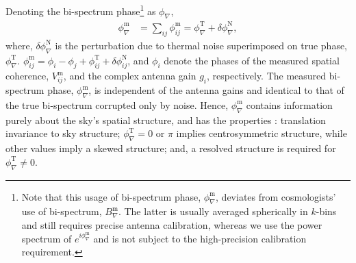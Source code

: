 \documentclass[
reprint,
superscriptaddress,
amsmath,
amssymb,
aps,
prd
]{revtex4-1}
\begin{document}

Denoting the bi-spectrum phase\footnote{Note that this usage of bi-spectrum phase, $\phi_\nabla^\textrm{m}$, deviates from cosmologists' use of bi-spectrum, $B_\nabla^\textrm{m}$. The latter is usually averaged spherically in $k$-bins and still requires precise antenna calibration, whereas we use the power spectrum of $e^{i\phi_\nabla^\textrm{m}}$ and is not subject to the high-precision calibration requirement.} as $\phi_\nabla$, 
\begin{align}
  \phi_\nabla^\textrm{m} &= \sum_{ij}\phi_{ij}^\textrm{m} = \phi_\nabla^\textrm{T} + \delta\phi_\nabla^\textrm{N} \label{eqn:cpphase-sum},
\end{align}
where, $\delta\phi_\nabla^\textrm{N}$ is the perturbation due to thermal noise superimposed on true phase, $\phi_\nabla^\textrm{T}$. $\phi_{ij}^\textrm{m} = \phi_i - \phi_j + \phi_{ij}^\textrm{T} + \delta\phi_{ij}^\textrm{N}$, and $\phi_i$ denote the phases of the measured spatial coherence, $V_{ij}^\textrm{m}$, and the complex antenna gain $g_i$, respectively. The measured bi-spectrum phase, $\phi_\nabla^\textrm{m}$, is independent of the antenna gains and identical to that of the true bi-spectrum corrupted only by noise. Hence, $\phi_\nabla^\textrm{m}$ contains information purely about the sky's spatial structure, and has the properties \cite{mon07}: translation invariance to sky structure; $\phi_\nabla^\textrm{T}=0$ or $\pi$ implies centrosymmetric structure, while other values imply a skewed structure; and, a resolved structure is required for $\phi_\nabla^\textrm{T}\ne 0$.
\end{document}
